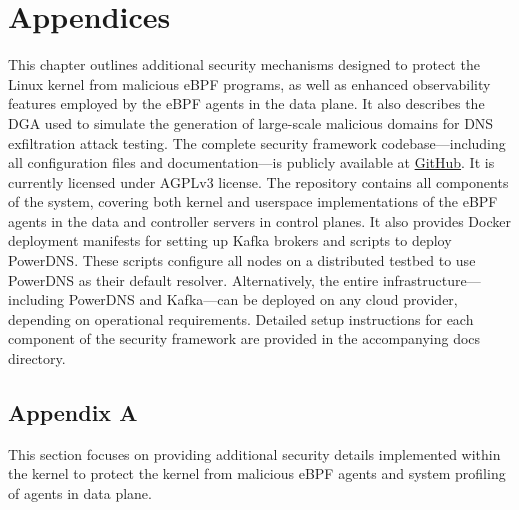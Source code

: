 \documentclass [11pt, proquest] {uwthesis}[2020/02/24]
\begin{document}
 





\chapter{Appendices}

This chapter outlines additional security mechanisms designed to protect the Linux kernel from malicious eBPF programs, as well as enhanced observability features employed by the eBPF agents in the data plane. It also describes the DGA used to simulate the generation of large-scale malicious domains for DNS exfiltration attack testing.
The complete security framework codebase—including all configuration files and documentation—is publicly available at \href{https://github.com/Synarcs/DNSObelisk}{GitHub}. It is currently licensed under AGPLv3 license.
The repository contains all components of the system, covering both kernel and userspace implementations of the eBPF agents in the data and controller servers in control planes. It also provides Docker deployment manifests for setting up Kafka brokers and scripts to deploy PowerDNS. These scripts configure all nodes on a distributed testbed to use PowerDNS as their default resolver. Alternatively, the entire infrastructure—including PowerDNS and Kafka—can be deployed on any cloud provider, depending on operational requirements.
Detailed setup instructions for each component of the security framework are provided in the accompanying docs directory.

\section{Appendix A}
This section focuses on providing additional security details implemented within the kernel to protect the kernel from malicious eBPF agents and system profiling of agents in data plane.
\end{document}
